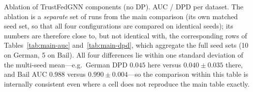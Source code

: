 \documentclass[pdflatex,sn-mathphys-num]{sn-jnl}
\theoremstyle{thmstyleone}%
\theoremstyle{thmstyletwo}%
\theoremstyle{thmstylethree}%
\begin{document}
\begin{table}[t]\centering\small
\caption{Ablation of TrustFedGNN components (no DP). AUC / DPD per dataset.
The ablation is a \emph{separate} set of runs from the main comparison (its own
matched seed set, so that all four configurations are compared on identical
seeds); its numbers are therefore close to, but not identical with, the
corresponding rows of Tables~\ref{tab:main-auc} and~\ref{tab:main-dpd}, which
aggregate the full seed sets (10 on German, 5 on Bail). All four differences
lie within one standard deviation of the multi-seed mean---e.g.\ German DPD
$0.045$ here versus $0.040\!\pm\!0.035$ there, and Bail AUC $0.988$ versus
$0.990\!\pm\!0.004$---so the comparison within this table is internally
consistent even where a cell does not reproduce the main table exactly.}
\label{tab:ablation}

\end{table}
\end{document}
